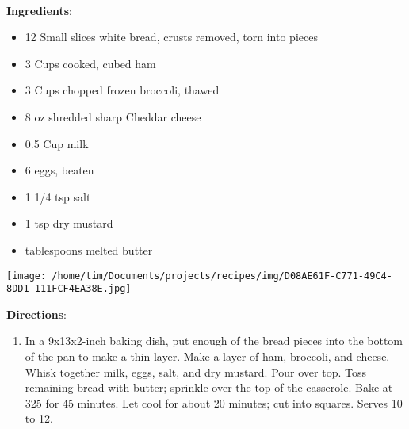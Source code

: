 \documentclass[11pt, twoside, openany]{book}
\begin{document}
 \label{ham-and-egg-casserole}\hfill\textit{}\\
\begin{minipage}[t]{0.8\linewidth}
\textbf{Ingredients}:\vspace{-3mm}
\begin{multicols}{2}
\begin{itemize}\setlength\itemsep{-1mm}
\item 12 Small slices white bread, crusts removed, torn into pieces
\item 3 Cups cooked, cubed ham
\item 3 Cups chopped frozen broccoli, thawed
\item 8 oz shredded sharp Cheddar cheese
\item 0.5 Cup milk
\item 6 eggs, beaten
\item 1 1/4 tsp salt
\item 1 tsp dry mustard
\item tablespoons melted butter
\end{itemize}
\end{multicols}
\end{minipage}
\begin{minipage}[t]{0.2\linewidth}
\centering \strut\vspace*{-\baselineskip}\newline
\texttt{[image: /home/tim/Documents/projects/recipes/img/D08AE61F-C771-49C4-8DD1-111FCF4EA38E.jpg]}\\
\end{minipage}\vspace{3mm}
\textbf{Directions}:
\vspace{-3mm}\begin{enumerate}\setlength\itemsep{-1mm}
\item In a 9x13x2-inch baking dish, put enough of the bread pieces into the bottom of the pan to make a thin layer. Make a layer of ham, broccoli, and cheese. Whisk together milk, eggs, salt, and dry mustard. Pour over top. Toss remaining bread with butter; sprinkle over the top of the casserole. Bake at 325 for 45 minutes. Let cool for about 20 minutes; cut into squares. Serves 10 to 12.
\end{enumerate}
 \label{butterscotch-brownies}\hfill\textit{}\\
\end{document}
